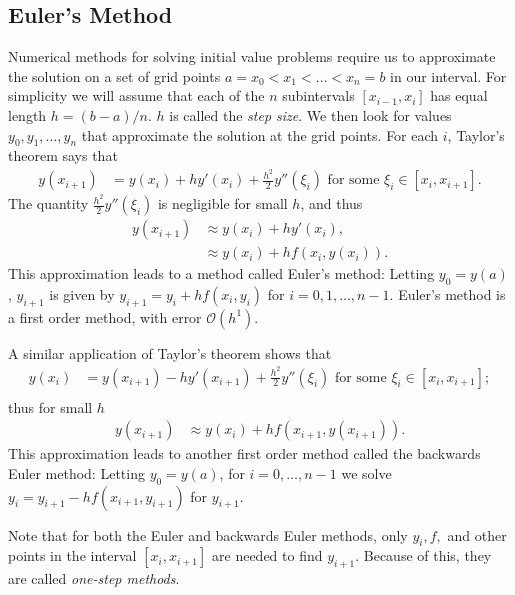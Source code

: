 \subsection*{Euler's Method}
Numerical methods for solving initial value problems require us to approximate the solution on a set of grid points $a = x_0< x_1<\hdots< x_n = b$ in our interval.  
For simplicity we will assume that each of the $n$ subintervals $[x_{i-1},x_i]$ has equal length $h = (b-a)/n$. $h$ is called the \textit{step size}. 
We then look for values $y_0, y_1, \hdots, y_n$ that approximate the solution at the grid points.
For each $i$, Taylor's theorem says that
\begin{align*}
y(x_{i+1}) &= y(x_{i}) + h y'(x_i) + \frac{h^2}{2} y''(\xi_i)\text{ for some }\xi_i \in [x_i,x_{i+1}].
\end{align*}
The quantity $\frac{h^2}{2} y''(\xi_i)$ is negligible for small $h$, and thus
\begin{align*}
y(x_{i+1}) &\approx y(x_{i}) + h y'(x_i)  ,\\
&\approx y(x_{i}) + h f(x_i,y(x_i)).
\end{align*}
This approximation leads to a method called Euler's method: Letting $y_0 = y(a)$, $y_{i+1}$ is given by $y_{i+1} = y_i +hf(x_i,y_i)$ for $i = 0, 1, \hdots, n-1$.
Euler's method is a first order method, with error $\mathcal{O}(h^1)$.

A similar application of Taylor's theorem shows that
\begin{align*}
y(x_{i}) &= y(x_{i+1}) - h y'(x_{i+1}) + \frac{h^2}{2} y''(\xi_i) \text{ for some } \xi_i \in [x_i,x_{i+1}]; \\
\end{align*}
thus for small $h$
\begin{align*}
y(x_{i+1}) &\approx  y(x_{i}) + h f(x_{i+1},y(x_{i+1})).
\end{align*}
This approximation leads to another first order method called the backwards Euler method: Letting $y_0 = y(a)$, for $i = 0, \hdots, n-1$ we  solve  $y_{i} = y_{i+1}-hf(x_{i+1},y_{i+1})$ for $y_{i+1}$.

Note that for both the Euler and backwards Euler methods, only $y_i, f,$ and other points in the interval $[x_i, x_{i+1}]$ are needed to find $y_{i+1}$. 
Because of this, they are called \textit{one-step methods}.

